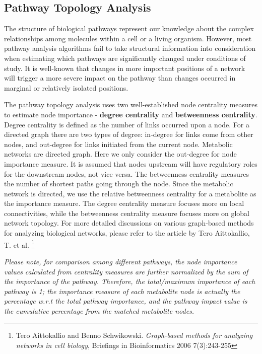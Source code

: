 \documentclass[a4paper]{article}
\begin{document}
\subsection{Pathway Topology Analysis}

The structure of biological pathways represent our knowledge about the complex relationships among molecules
within a cell or a living organism. However, most pathway analysis algorithms fail to take structural information
into consideration when estimating which pathways are significantly changed under conditions of study. 
It is well-known that changes in more important positions of a network will trigger a more severe
impact on the pathway than changes occurred in marginal or relatively isolated positions.



The pathway topology analysis uses two well-established node centrality measures to estimate node importance - \textbf{degree centrality}
and \textbf{betweenness centrality}. Degree centrality is defined as the number of links occurred upon a node.
For a directed graph there are two types of degree: in-degree for links come from other nodes, and out-degree
for links initiated from the current node. Metabolic networks are directed graph. Here we only consider the
out-degree for node importance measure. It is assumed that nodes upstream will have regulatory roles for
the downstream nodes, not vice versa. The betweenness centrality measures the number of shortest paths going
through the node. Since the metabolic network is directed, we use the relative betweenness centrality for a metabolite
as the importance measure. The degree centrality measure focuses more on local connectivities, while the betweenness
centrality measure focuses more on global network topology. For more detailed discussions on various graph-based
methods for analyzing biological networks, please refer to the article by Tero Aittokallio, T. et al.
\footnote{Tero Aittokallio and Benno Schwikowski. \textit{Graph-based methods for analyzing networks in cell biology},
Briefings in Bioinformatics 2006 7(3):243-255}



\textit{Please note, for comparison among different pathways, the node importance values calculated from centrality measures
are further normalized by the sum of the importance of the pathway. Therefore, the total/maximum importance of each pathway
is 1; the importance measure of each metabolite node is actually the percentage w.r.t the total pathway importance,
and the pathway impact value is the cumulative percentage from the matched metabolite nodes.}
\end{document}
